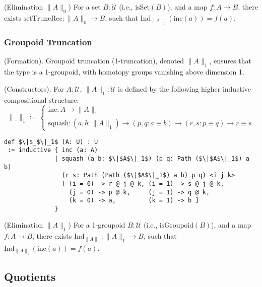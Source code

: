 \begin{theorem} (Elimination \( \| A \|_0 \))
For a set \( B : \mathcal{U} \) (i.e., \( \text{isSet}(B) \)), and a map \( f : A \to B \),
there exists \( \text{setTruncRec} : \| A \|_0 \to B \), such that \( \text{Ind}_{\|A\|_0}(\text{inc}(a)) = f(a) \).
\end{theorem}

\subsubsection*{Groupoid Truncation}
\begin{definition} (Formation).
Groupoid truncation (1-truncation), denoted \( \| A \|_1 \), ensures that
the type is a 1-groupoid, with homotopy groups vanishing above dimension 1.
\end{definition}

\begin{definition} (Constructors).
For \( A : \mathcal{U} \), \( \| A \|_1 : \mathcal{U} \) is defined by the following higher
inductive compositional structure:
\[
\| \_ \|_1 :=
\begin{cases}
\text{inc} : A \to \| A \|_1 \\
\text{squash} : (a, b : \| A \|_1) \to (p, q : a \equiv b) \to (r, s : p \equiv q) \to r \equiv s
\end{cases}
\]
\begin{lstlisting}[mathescape=true]
def $\|$_$\|_1$ (A: U) : U
 := inductive { inc (a: A)
              | squash (a b: $\|$A$\|_1$) (p q: Path ($\|$A$\|_1$) a b)
                (r s: Path (Path ($\|$A$\|_1$) a b) p q) <i j k>
                [ (i = 0) -> r @ j @ k, (i = 1) -> s @ j @ k,
                  (j = 0) -> p @ k,     (j = 1) -> q @ k,
                  (k = 0) -> a,         (k = 1) -> b ]
              }
\end{lstlisting}
\end{definition}

\begin{theorem} (Elimination \( \| A \|_1 \))
For a 1-groupoid \( B : \mathcal{U} \) (i.e., \( \text{isGroupoid}(B) \)),
and a map \( f : A \to B \), there exists \( \text{Ind}_{\|A\|_1} : \|A\|_1 \to B \),
such that \( \text{Ind}_{\|A\|_1}(\text{inc}(a)) = f(a) \).
\end{theorem}

\newpage
\subsection{Quotients}
